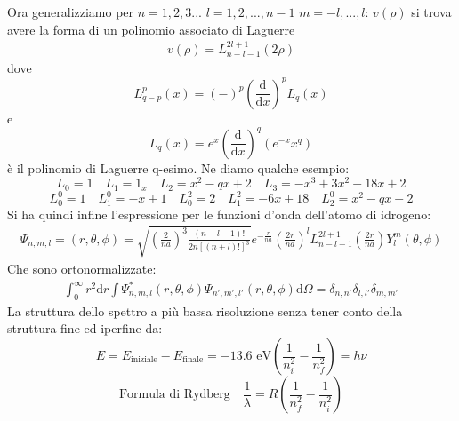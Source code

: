 Ora generalizziamo per $n=1,2,3...$ \quad $l=1,2,...,n-1$ \quad $m=-l,...,l$:  $v(\rho)$ si trova avere la forma di un polinomio associato di Laguerre 
\begin{equation}\begin{split} 
v\left(\rho\right)=L_{n-l-1}^{2l+1}\left(2\rho\right)
\end{split}\end{equation}
dove
\begin{equation}
L_{q-p}^{p}\left(x\right)=\left(-\right)^p\left(\frac{\textrm{d}}{\textrm{d}x}\right)^pL_q\left(x\right)
\end{equation}
e \begin{equation}
L_q\left(x\right)=e^x\left(\frac{\textrm{d}}{\textrm{d}x}\right)^q\left(e^{-x}x^q\right)
\end{equation} è il polinomio di Laguerre q-esimo. Ne diamo qualche esempio:
\begin{equation}
L_0=1 \quad L_1=1_x \quad L_2=x^2-qx+2 \quad L_3=-x^3+3x^2-18x+2 
\end{equation}
\begin{equation}
L_0^0=1 \quad L_1^0=-x+1 \quad L_0^2=2 \quad L_1^2=-6x+18 \quad L_2^0=x^2-qx+2
\end{equation}
Si ha quindi infine l'espressione per le funzioni d'onda dell'atomo di idrogeno:
\begin{equation}\begin{split}
\Psi _{n,m,l}=\left(r,\theta,\phi\right)=\sqrt{\left(\frac{2}{na}\right)^3\frac{\left(n-l-1\right)!}{2n\left[\left(n+l\right)!\right]^3}}e^{-\frac{r}{na}}\left(\frac{2r}{na}\right)^lL_{n-l-1}^{2l+1}\left(\frac{2r}{na}\right)Y^m_l\left(\theta,\phi\right)
\end{split}\end{equation}
Che sono ortonormalizzate:
\begin{equation}\begin{split}
\int_{0}^{\infty }{r^2 \textrm{d}r}\int{\Psi ^*_{n,m,l}\left(r,\theta,\phi\right)\Psi _{n',m',l'}\left(r,\theta,\phi\right) \textrm{d}\Omega}=\delta_{n,n'}\delta_{l,l'}\delta_{m,m'}
\end{split}\end{equation}
La struttura dello spettro a più bassa risoluzione senza tener conto della struttura fine ed iperfine da:
\begin{equation}
E=E_{\textrm{iniziale}}-E_{\textrm{finale}}=-13.6 \textrm{ eV} \left(\frac{1}{n_i^2}-\frac{1}{n_f^2}\right)=h\nu 
\end{equation}
\begin{equation}
\textrm{Formula di Rydberg}\quad \frac{1}{\lambda}=R\left(\frac{1}{n_f^2}-\frac{1}{n_i^2}\right)
\end{equation}
